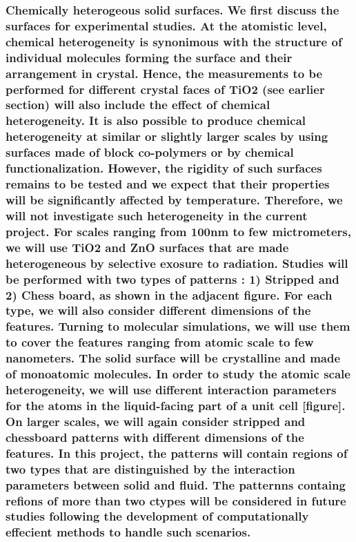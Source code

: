 \documentclass[a4paper,12pt,single,pdftex]{scrartcl}
\begin{document}
{\label{ID_555034144}\subsubsection{Chemically heterogeous solid surfaces. We first discuss the surfaces for experimental studies. At the atomistic level, chemical heterogeneity is synonimous with the structure of individual molecules forming the surface and their arrangement in crystal. Hence, the measurements to be performed for different crystal faces of TiO2 (see earlier section) will also include the effect of chemical heterogeneity. It is also possible to produce chemical heterogeneity at similar or slightly larger scales by using surfaces made of block co-polymers or by chemical functionalization. However, the rigidity of such surfaces remains to be tested and we expect that their properties will be significantly affected by temperature. Therefore, we will not investigate such heterogeneity in the current project. For scales ranging from 100nm to few mictrometers, we will use TiO2 and ZnO surfaces that are made heterogeneous by selective exosure to radiation. Studies will be performed with two types of patterns : 1) Stripped and 2) Chess board, as shown in the adjacent figure. For each type, we will also consider different dimensions of the features. Turning to molecular simulations, we will use them to cover the features ranging from atomic scale to few nanometers. The solid surface will be crystalline and made of monoatomic molecules. In order to study the atomic scale heterogeneity, we will use different interaction parameters for the atoms  in the liquid-facing part of a unit cell [figure]. On larger scales, we will again consider stripped and chessboard patterns with different dimensions of the features. In this project, the patterns will contain regions of  two types that are distinguished by the interaction parameters between solid and fluid. The patternns containg refions of more than two ctypes will be considered in future studies following the development of computationally effecient methods to handle such scenarios.}

}
\end{document}
